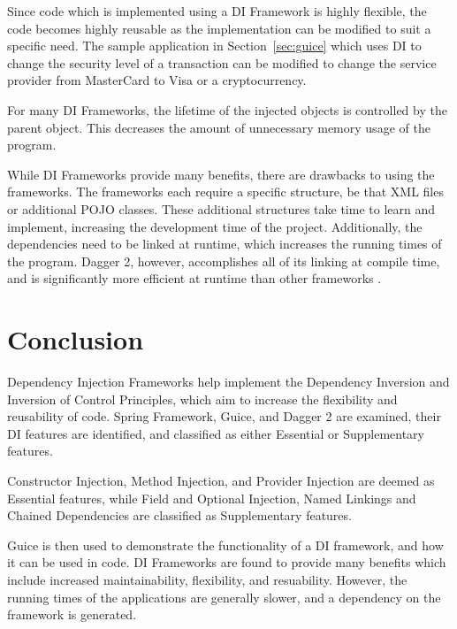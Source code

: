 \documentclass[12pt,twocolumn]{IEEEtran}
\begin{document}
Since code which is implemented using a DI Framework is highly flexible, the code becomes highly reusable as the implementation can be modified to suit a specific need. The sample application in Section~\ref{sec:guice} which uses DI to change the security level of a transaction can be modified to change the service provider from MasterCard to Visa or a cryptocurrency. 

For many DI Frameworks, the lifetime of the injected objects is controlled by the parent object. This decreases the amount of unnecessary memory usage of the program.

While DI Frameworks provide many benefits, there are drawbacks to using the frameworks. The frameworks each require a specific structure, be that XML files or additional POJO classes. These additional structures take time to learn and implement, increasing the development time of the project. Additionally, the dependencies need to be linked at runtime, which increases the running times of the program. Dagger 2, however, accomplishes all of its linking at compile time, and is significantly more efficient at runtime than other frameworks \cite{androiddeveloperguide}.


\section{Conclusion}

Dependency Injection Frameworks help implement the Dependency Inversion and Inversion of Control Principles, which aim to increase the flexibility and reusability of code. Spring Framework, Guice, and Dagger 2 are examined, their DI features are identified, and classified as either Essential or Supplementary features. 

Constructor Injection, Method Injection, and Provider Injection are deemed as Essential features, while Field and Optional Injection, Named Linkings and Chained Dependencies are classified as Supplementary features.

Guice is then used to demonstrate the functionality of a DI framework, and how it can be used in code. DI Frameworks are found to provide many benefits which include increased maintainability, flexibility, and resuability. However, the running times of the applications are generally slower, and a dependency on the framework is generated.





\clearpage
\onecolumn
\appendices
\renewcommand\thefigure{\thesection.\arabic{figure}} 
\renewcommand\theequation{\thesection.\arabic{equation}} 
\renewcommand\thetable{\thesection.\arabic{table}}
\renewcommand\thelstlisting{\thesection.\arabic{lstlisting}}
\end{document}
